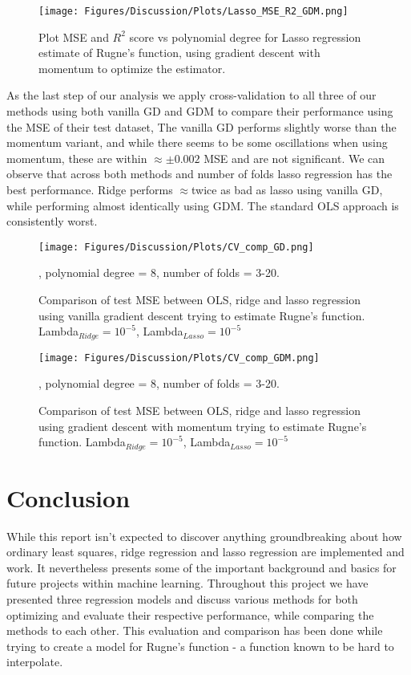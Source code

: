 \documentclass[amssymb,twocolumn,aps]{revtex4}
\begin{document}
\begin{figure}[h]
    \centering
    \texttt{[image: Figures/Discussion/Plots/Lasso\_MSE\_R2\_GDM.png]}
    \caption{Plot MSE and $R^2$ score vs polynomial degree for Lasso regression estimate of Rugne's function, using gradient descent with momentum to optimize the estimator.}
    \label{fig:lasso_mse_gdm}
\end{figure}

As the last step of our analysis we apply cross-validation to all three of our methods using both vanilla GD and GDM to compare their performance using the MSE of their test dataset, The vanilla GD performs slightly worse than the momentum variant, and while there seems to be some oscillations when using momentum, these are within $\approx\pm0.002$ MSE and are not significant. We can observe that across both methods and number of folds lasso regression has the best performance. Ridge performs $\approx$twice as bad as lasso using vanilla GD, while performing almost identically using GDM. The standard OLS approach is consistently worst.

\begin{figure}[h]
    \centering
    \texttt{[image: Figures/Discussion/Plots/CV\_comp\_GD.png]}
    \caption{Comparison of test MSE between OLS, ridge and lasso regression using vanilla gradient descent trying to estimate Rugne's function. Lambda$_{Ridge} = 10^{-5}$, Lambda$_{Lasso} = 10^{-5}$}, polynomial degree = 8, number of folds = 3-20.
    \label{fig:CV_comp_GD}
\end{figure}

\begin{figure}[h]
    \centering
    \texttt{[image: Figures/Discussion/Plots/CV\_comp\_GDM.png]}
    \caption{Comparison of test MSE between OLS, ridge and lasso regression using gradient descent with momentum trying to estimate Rugne's function. Lambda$_{Ridge} = 10^{-5}$, Lambda$_{Lasso} = 10^{-5}$}, polynomial degree = 8, number of folds = 3-20.
    \label{fig:CV_comp_GDM}
\end{figure}


\section{Conclusion}\label{section:conclusion}

While this report isn't expected to discover anything groundbreaking about how ordinary least squares, ridge regression and lasso regression are implemented and work. It nevertheless presents some of the important background and basics for future projects within machine learning. Throughout this project we have presented  three regression models and discuss various methods for both optimizing and evaluate their respective performance, while comparing the methods to each other. This evaluation and comparison has been done while trying to create a model for Rugne's function - a function known to be hard to interpolate.
\end{document}
